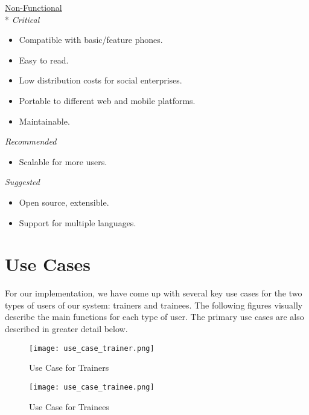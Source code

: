 \underline{Non-Functional}\\*
\textit{Critical}
\begin{itemize}
\item Compatible with basic/feature phones.
\item Easy to read.
\item Low distribution costs for social enterprises.
\item Portable to different web and mobile platforms.
\item Maintainable.
\end{itemize}

\textit{Recommended}
\begin{itemize}
\item Scalable for more users.
\end{itemize}

\textit{Suggested}
\begin{itemize}
\item Open source, extensible.
\item Support for multiple languages.
\end{itemize}

\section{Use Cases}
For our implementation, we have come up with several key use cases for the two types of users of our system: trainers and trainees. The following figures visually describe the main functions for each type of user. The primary use cases are also described in greater detail below.

\begin{figure}[H]
	\centering
	\texttt{[image: use\_case\_trainer.png]}
	\caption{Use Case for Trainers}
\end{figure}

\begin{figure}[H]
	\centering
	\texttt{[image: use\_case\_trainee.png]}
	\caption{Use Case for Trainees}
\end{figure}


